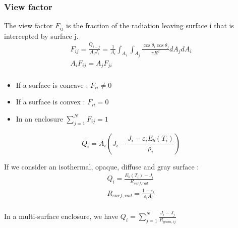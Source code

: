 \documentclass[../main.tex]{subfiles}
\begin{document}
\subsubsection{View factor}
The view factor $F_{ij}$ is the fraction of the radiation leaving surface i that is intercepted by surface j.\\
\begin{equation}\begin{gathered}
    F_{ij} =  \frac{Q_{i-j}}{A_iJ_i} = \frac{1}{A_i} \int_{A_i} \int_{A_j} \frac{\cos \theta_i \cos\theta_j}{\pi R^2} dA_jdA_i\\
    A_i F_{ij} = A_j F_{ji}\\
    \end{gathered}
\end{equation}
\begin{itemize}
    \item If a surface is concave : $F_{ii} \neq 0$\\
    \item If a surface is convex : $F_{ii} = 0$\\
    \item In an enclosure $\sum_{j = 1}^N F_{ij} = 1$\\
\end{itemize}

\begin{equation}
    Q_i = A_i (J_i - \frac{J_i - \varepsilon_i E_b(T_i)}{\rho_i})
\end{equation}

If we consider an isothermal, opaque, diffuse and gray surface : \begin{equation}
    \begin{gathered}
        Q_i = \frac{E_b(T_i) - J_i}{R_{surf,rad}}\\
        R_{surf, rad} = \frac{1-\varepsilon_i}{\varepsilon_i A_i}\\
    \end{gathered}
\end{equation}

In a multi-surface enclosure, we have $Q_i = \sum_{j=1}^N \frac{J_i-J_j}{R_{geom, ij}}$\\
\end{document}
